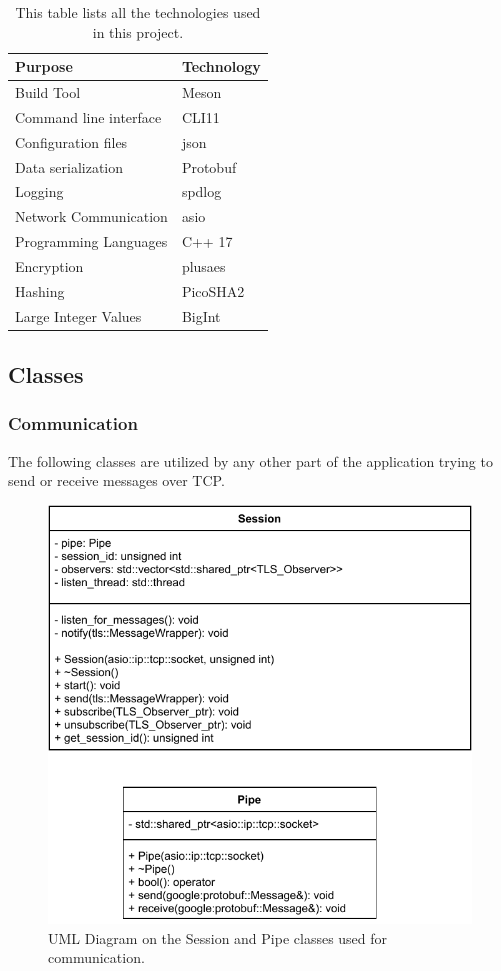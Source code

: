 \documentclass[12pt, letterpaper]{article}
\begin{document}
\begin{table}[h]
	\centering
	\begin{tabular}{l|l}
		Purpose                       & Technology \\ \hline
		Build Tool				 	  & Meson	   \\
		Command line interface	      & CLI11      \\
		Configuration files           & json       \\
		Data serialization            & Protobuf   \\
		Logging                       & spdlog     \\
		Network Communication         & asio       \\
		Programming Languages		  & C++ 17 \\
		Encryption 					& plusaes \\
		Hashing 					& PicoSHA2 \\
		Large Integer Values & BigInt \\
	\end{tabular}
	\caption{This table lists all the technologies used in this project.}
\end{table}

\subsection{Classes}

\subsubsection{Communication}
The following classes are utilized by any other part of the application trying to send or receive messages over TCP.

\begin{figure}[H]
	\centering
	\includegraphics[width=.6\textwidth]{UML/CommunicationClasses}
	\caption{UML Diagram on the Session and Pipe classes used for communication.}
	\label{fig:CommunicationClasses}
\end{figure}
\end{document}
